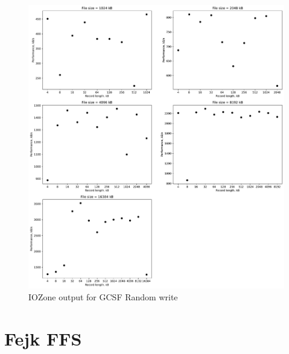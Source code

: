\begin{figure}[!htb]
	\label{fig:app_bench_gcsf_rnd_write}
	\begin{center}
		\includegraphics[width=1.0\textwidth]{figures/benchmarking/gcsf/Random write.pdf}
	\end{center}
	\caption{IOZone output for \gls{GCSF} Random write}
\end{figure}
\section{Fejk FFS}








